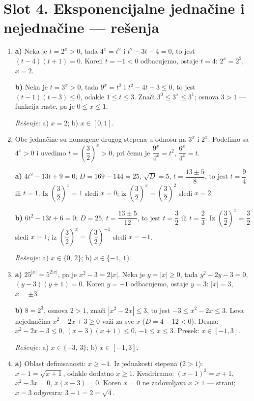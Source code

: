 \section*{Slot 4. Eksponencijalne jednačine i nejednačine — rešenja}
\begin{enumerate}[label=\arabic*.]
\item \textbf{a)} Neka je $t=2^{x}>0$, tada $4^{x}=t^{2}$ i $t^{2}-3t-4=0$, to jest $(t-4)(t+1)=0$. Koren $t=-1<0$ odbacujemo, ostaje $t=4$: $2^{x}=2^{2}$, $x=2$.

\textbf{b)} Neka je $t=3^{x}>0$, tada $9^{x}=t^{2}$ i $t^{2}-4t+3\le 0$, to jest $(t-1)(t-3)\le 0$, odakle $1\le t\le 3$. Znači $3^{0}\le 3^{x}\le 3^{1}$; osnova $3>1$ — funkcija raste, pa je $0\le x\le 1$.

\emph{Rešenje:} a) $x=2$; b) $x\in[0,1]$.

\item Obe jednačine su homogene drugog stepena u odnosu na $3^{x}$ i $2^{x}$. Podelimo sa $4^{x}>0$ i uvedimo $t=\left(\dfrac{3}{2}\right)^{x}>0$, pri čemu je $\dfrac{9^{x}}{4^{x}}=t^{2}$, $\dfrac{6^{x}}{4^{x}}=t$.

\textbf{a)} $4t^{2}-13t+9=0$; $D=169-144=25$, $\sqrt{D}=5$, $t=\dfrac{13\pm5}{8}$, to jest $t=\dfrac{9}{4}$ ili $t=1$. Iz $\left(\dfrac{3}{2}\right)^{x}=1$ sledi $x=0$; iz $\left(\dfrac{3}{2}\right)^{x}=\left(\dfrac{3}{2}\right)^{2}$ sledi $x=2$.

\textbf{b)} $6t^{2}-13t+6=0$; $D=25$, $t=\dfrac{13\pm5}{12}$, to jest $t=\dfrac{3}{2}$ ili $t=\dfrac{2}{3}$. Iz $\left(\dfrac{3}{2}\right)^{x}=\dfrac{3}{2}$ sledi $x=1$; iz $\left(\dfrac{3}{2}\right)^{x}=\left(\dfrac{3}{2}\right)^{-1}$ sledi $x=-1$.

\emph{Rešenje:} a) $x\in\{0,\,2\}$; b) $x\in\{-1,\,1\}$.

\item \textbf{a)} $25^{|x|}=5^{2|x|}$, pa je $x^{2}-3=2|x|$. Neka je $y=|x|\ge 0$, tada $y^{2}-2y-3=0$, $(y-3)(y+1)=0$. Koren $y=-1$ odbacujemo, ostaje $y=3$: $|x|=3$, $x=\pm3$.

\textbf{b)} $8=2^{3}$, osnova $2>1$, znači $|x^{2}-2x|\le 3$, to jest $-3\le x^{2}-2x\le 3$. Leva nejednačina $x^{2}-2x+3\ge 0$ važi za sve $x$ ($D=4-12<0$). Desna: $x^{2}-2x-3\le 0$, $(x-3)(x+1)\le 0$, $-1\le x\le 3$. Presek: $x\in[-1,3]$.

\emph{Rešenje:} a) $x\in\{-3,\,3\}$; b) $x\in[-1,3]$.

\item \textbf{a)} Oblast definisanosti: $x\ge -1$. Iz jednakosti stepena ($2>1$): $x-1=\sqrt{x+1}$, odakle dodatno $x\ge 1$. Kvadriramo: $(x-1)^{2}=x+1$, $x^{2}-3x=0$, $x(x-3)=0$. Koren $x=0$ ne zadovoljava $x\ge 1$ — strani; $x=3$ odgovara: $3-1=2=\sqrt{4}$.


\end{enumerate}
